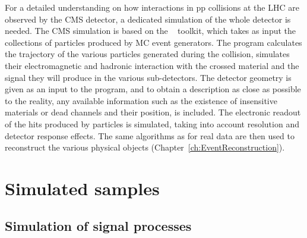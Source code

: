 For a detailed understanding on how interactions in pp collisions at the LHC are observed by the CMS detector, a dedicated simulation of the whole detector is needed.
The CMS simulation is based on the \GEANTfour~\cite{Agostinelli:2002hh} toolkit, which takes as input the collections of particles produced by MC event generators.
The program calculates the trajectory of the various particles generated during the collision, simulates their electromagnetic and hadronic interaction with the crossed material and the signal they will produce in the various sub-detectors. The detector geometry is given as an input to the program, and to obtain a description as close as possible to the reality, any available information such as the existence of insensitive materials or dead channels and their position, is included. The electronic readout of the hits produced by particles is simulated, taking into account resolution and detector response effects.
The same algorithms as for real data are then used to reconstruct the various physical objects (Chapter~\ref{ch:EventReconstruction}).

\section{Simulated samples}\label{sec:MCsamples}

\subsection{Simulation of signal processes}\label{subsec:signalMC}

